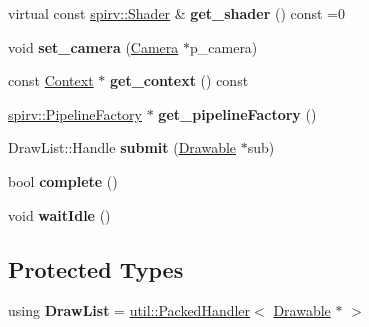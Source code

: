 \begin{DoxyCompactItemize}
\item 
\mbox{\label{classblaze_1_1ARenderer_a1d11ebeeb512737eb6a83e41e08dd4b7}} 
virtual const \hyperlink{structblaze_1_1spirv_1_1Shader}{spirv\+::\+Shader} \& {\bfseries get\+\_\+shader} () const =0
\item 
\mbox{\label{classblaze_1_1ARenderer_ae7d0ba1357bb08846d9e1560d216f941}} 
void {\bfseries set\+\_\+camera} (\hyperlink{classblaze_1_1Camera}{Camera} $\ast$p\+\_\+camera)
\item 
\mbox{\label{classblaze_1_1ARenderer_aac99ae31776dd569358e5c3789698eda}} 
const \hyperlink{classblaze_1_1Context}{Context} $\ast$ {\bfseries get\+\_\+context} () const
\item 
\mbox{\label{classblaze_1_1ARenderer_ad51e674928ead1dd0de3b47eac1016e8}} 
\hyperlink{classblaze_1_1spirv_1_1PipelineFactory}{spirv\+::\+Pipeline\+Factory} $\ast$ {\bfseries get\+\_\+pipeline\+Factory} ()
\item 
\mbox{\label{classblaze_1_1ARenderer_a16f2a88de5037de409395d7c372a78b1}} 
Draw\+List\+::\+Handle {\bfseries submit} (\hyperlink{classblaze_1_1Drawable}{Drawable} $\ast$sub)
\item 
\mbox{\label{classblaze_1_1ARenderer_a96980e0eb62b07195e3bb0e028b51da1}} 
bool {\bfseries complete} ()
\item 
\mbox{\label{classblaze_1_1ARenderer_ae6042349671dc48ec48c73ff60934a56}} 
void {\bfseries wait\+Idle} ()
\end{DoxyCompactItemize}
\subsection*{Protected Types}
\begin{DoxyCompactItemize}
\item 
\mbox{\label{classblaze_1_1ARenderer_afe4f1ac0fa4f6af7c49d0421020d7cec}} 
using {\bfseries Draw\+List} = \hyperlink{classblaze_1_1util_1_1PackedHandler}{util\+::\+Packed\+Handler}$<$ \hyperlink{classblaze_1_1Drawable}{Drawable} $\ast$ $>$
\end{DoxyCompactItemize}
